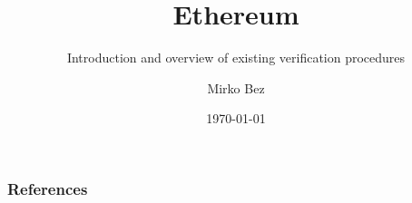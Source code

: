 \documentclass[usenames,dvipsnames]{beamer}
\title{Ethereum}
\subtitle{Introduction and overview of existing verification procedures}
\author{Mirko Bez}
\institute{Università di Padova}
\date{\today}
\begin{document}
\begin{frame}
  \titlepage
\end{frame}










\begin{frame}[allowframebreaks]
        \frametitle{References}
        
        
\end{frame}
\end{document}
